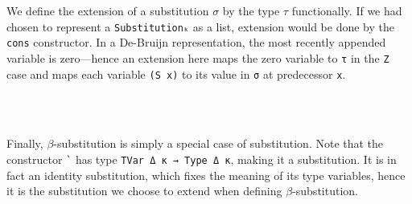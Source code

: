 \documentclass[authoryear, acmsmall, screen, review, nonacm]{acmart}
\begin{document}
We define the extension of a substitution $\sigma$ by the type $\tau$ functionally. If we had chosen to represent a \verb!Substitutionₖ! as a list, extension would be done by the \verb!cons! constructor. In a De-Bruijn representation, the most recently appended variable is zero---hence an extension here maps the zero variable to \verb!τ! in the \verb!Z! case and maps each variable \verb!(S x)! to its value in \verb!σ! at predecessor \verb!x!.

\begin{code}%
\>[0]\AgdaSpace{}%
\AgdaSymbol{:}\AgdaSpace{}%
\AgdaSpace{}%
\AgdaSpace{}%
\AgdaSpace{}%
\AgdaSpace{}%
\AgdaSymbol{(}\AgdaSpace{}%
\AgdaSymbol{:}\AgdaSpace{}%
\AgdaSpace{}%
\AgdaSpace{}%
\AgdaSymbol{)}\AgdaSpace{}%
\AgdaSpace{}%
\AgdaSpace{}%
\AgdaSymbol{(}\AgdaSpace{}%
\AgdaOperator{\AgdaInductiveConstructor{,,}}\AgdaSpace{}%
\AgdaSymbol{)}\AgdaSpace{}%
\<%
\\
\>[0]\AgdaSpace{}%
\AgdaSpace{}%
\AgdaSpace{}%
\AgdaSpace{}%
\AgdaSymbol{=}\AgdaSpace{}%
\<%
\\
\>[0]\AgdaSpace{}%
\AgdaSpace{}%
\AgdaSpace{}%
\AgdaSymbol{(}\AgdaSpace{}%
\AgdaSymbol{)}\AgdaSpace{}%
\AgdaSymbol{=}\AgdaSpace{}%
\AgdaSpace{}%
\<%
\end{code}

Finally, $\beta$-substitution is simply a special case of substitution. Note that the constructor \verb!`! has type \verb!TVar Δ κ → Type Δ κ!, making it a substitution. It is in fact an identity substitution, which fixes the meaning of its type variables, hence it is the substitution we choose to extend when defining $\beta$-substitution.

\begin{code}%
\>[0]\AgdaSpace{}%
\AgdaSymbol{:}\AgdaSpace{}%
\AgdaSpace{}%
\AgdaSymbol{(}\AgdaSpace{}%
\AgdaOperator{\AgdaInductiveConstructor{,,}}\AgdaSpace{}%
\AgdaSymbol{)}\AgdaSpace{}%
\AgdaSpace{}%
\AgdaSpace{}%
\AgdaSpace{}%
\AgdaSpace{}%
\AgdaSpace{}%
\AgdaSpace{}%
\AgdaSpace{}%
\AgdaSpace{}%
\<%
\\
\>[0]\AgdaSpace{}%
\AgdaOperator{\AgdaFunction{βₖ[}}\AgdaSpace{}%
\AgdaSpace{}%
\AgdaOperator{\AgdaFunction{]}}\AgdaSpace{}%
\AgdaSymbol{=}\AgdaSpace{}%
\AgdaSpace{}%
\AgdaSymbol{(}\AgdaSpace{}%
\AgdaSpace{}%
\AgdaSymbol{)}\AgdaSpace{}%
\<%
\end{code}
\end{document}
